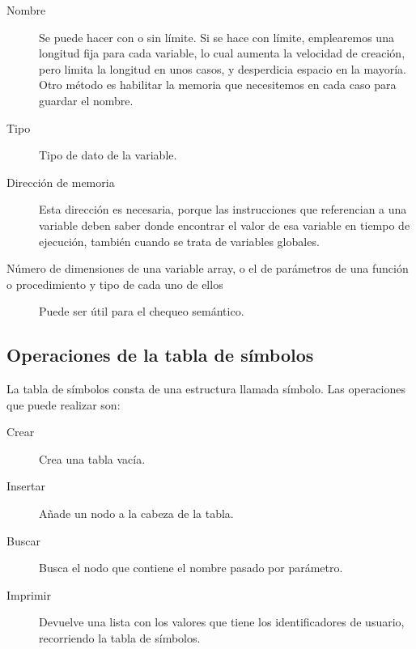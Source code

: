 \documentclass[11pt, english]{article}
\begin{document}
	\begin{description}
		
		\item[Nombre] Se puede hacer con o sin límite. Si se hace con límite, emplearemos una longitud fija para cada variable, lo cual aumenta la velocidad de creación, pero limita la longitud en unos casos, y desperdicia espacio en la mayoría. Otro método es habilitar la memoria que necesitemos en cada caso para guardar el nombre.\newline
		\item[Tipo] Tipo de dato de la variable.\newline
		\item[Dirección de memoria] Esta dirección es necesaria, porque las instrucciones que referencian a una variable deben saber donde encontrar el valor de esa variable en tiempo de ejecución, también cuando se trata de variables globales.\newline
		\item[Número de dimensiones de una variable array, o el de parámetros de una función o procedimiento y tipo de cada uno de ellos] Puede ser útil para el chequeo semántico.\newline
		
	\end{description}

	\newpage
	
	\subsection{Operaciones de la tabla de símbolos}

	La tabla de símbolos consta de una estructura llamada símbolo. Las operaciones que puede realizar son:
	
	\begin{description}
		
		\item[Crear] Crea una tabla vacía.\newline
		\item[Insertar] Añade un nodo a la cabeza de la tabla.\newline
		\item[Buscar] Busca el nodo que contiene el nombre pasado por parámetro.\newline
		\item[Imprimir] Devuelve una lista con los valores que tiene los identificadores de usuario, recorriendo la tabla de símbolos.\newline
		
	\end{description}
\end{document}
